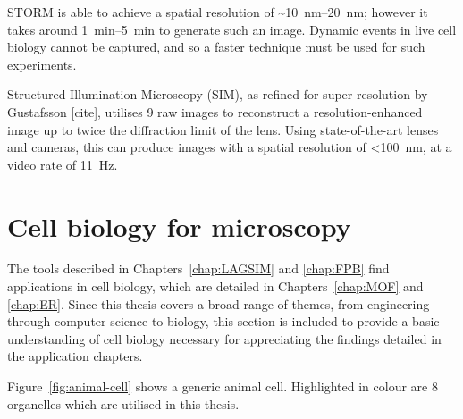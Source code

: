 STORM is able to achieve a spatial resolution of \textasciitilde\SIrange[range-phrase=--]{10}{20}{\nano\metre}; however it takes around \SIrange[range-phrase=--]{1}{5}{\minute} to generate such an image.
Dynamic events in live cell biology cannot be captured, and so a faster technique must be used for such experiments. 

Structured Illumination Microscopy (SIM), as refined for super-resolution by Gustafsson [cite], utilises 9 raw images to reconstruct a resolution-enhanced image up to twice the diffraction limit of the lens.
Using state-of-the-art lenses and cameras, this can produce images with a spatial resolution of <\SI{100}{\nano\metre}, at a video rate of \SI{11}{\hertz}.  


\section{Cell biology for microscopy}
The tools described in Chapters~\ref{chap:LAGSIM} and \ref{chap:FPB} find applications in cell biology, which are detailed in Chapters~\ref{chap:MOF} and \ref{chap:ER}.
Since this thesis covers a broad range of themes, from engineering through computer science to biology, this section is included to provide a basic understanding of cell biology necessary for appreciating the findings detailed in the application chapters. 

Figure~\ref{fig:animal-cell} shows a generic animal cell. 
Highlighted in colour are 8 organelles which are utilised in this thesis. 

